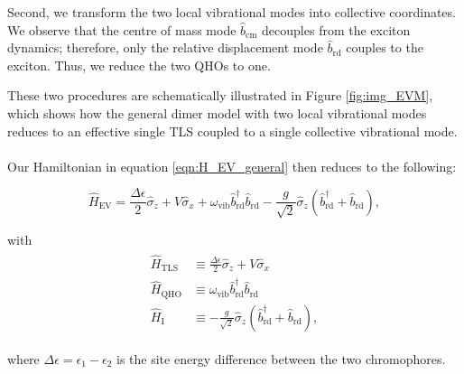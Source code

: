 \documentclass[11pt]{article}
\begin{document}
Second, we transform the two local vibrational modes into collective coordinates. We observe that the centre of mass mode $\hat{b}_{\scriptscriptstyle \text{cm}}$ decouples from the exciton dynamics; therefore, only the relative displacement mode $\hat{b}_{\scriptscriptstyle \text{rd}}$ couples to the exciton. Thus, we reduce the two QHOs to one.

These two procedures are schematically illustrated in Figure \ref{fig:img_EVM}, which shows how the general dimer model with two local vibrational modes reduces to an effective single TLS coupled to a single collective vibrational mode.\\
\\
Our Hamiltonian in equation \eqref{eqn:H_EV_general} then reduces to the following:

\begin{equation} \label{eqn:H_EV}
    \hat{H}_{\scriptscriptstyle \text{EV}} = \frac{\Delta\epsilon}{2}\hat{\sigma}_z + V\hat{\sigma}_x + \omega_{\scriptscriptstyle \text{vib}} \hat{b}_{\scriptscriptstyle \text{rd}}^\dagger \hat{b}_{\scriptscriptstyle \text{rd}} -\frac{g}{\sqrt{2}}\hat{\sigma}_z\left(\hat{b}_{\scriptscriptstyle \text{rd}}^\dagger + \hat{b}_{\scriptscriptstyle \text{rd}}\right),
\end{equation}

with 
\begin{align*}
    \begin{aligned}
        \hat{H}_{\scriptscriptstyle \text{TLS}} &\equiv \frac{\Delta\epsilon}{2}\hat{\sigma}_z + V\hat{\sigma}_x \\
        \hat{H}_{\scriptscriptstyle \text{QHO}} &\equiv \omega_{\scriptscriptstyle \text{vib}} \hat{b}_{\scriptscriptstyle \text{rd}}^\dagger \hat{b}_{\scriptscriptstyle \text{rd}} \\
        \hat{H}_{\scriptscriptstyle \text{I}} &\equiv-\frac{g}{\sqrt{2}}\hat{\sigma}_z\left(\hat{b}_{\scriptscriptstyle \text{rd}}^\dagger + \hat{b}_{\scriptscriptstyle \text{rd}}\right),
    \end{aligned}
\end{align*}

where $\Delta\epsilon = \epsilon_1 - \epsilon_2$ is the site energy difference between the two chromophores. \\
\end{document}
